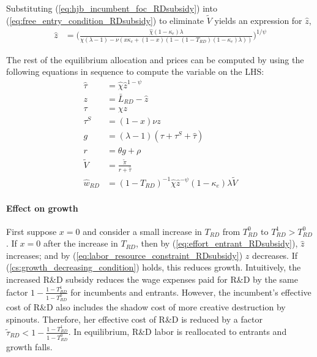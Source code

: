 \documentclass[11pt,english]{article}
\begin{document}
Substituting (\ref{eq:hjb_incumbent_foc_RDsubsidy}) into (\ref{eq:free_entry_condition_RDsubsidy}) to eliminate $\tilde{V}$ yields an expression for $\hat{z}$, 
\begin{align}
\hat{z} &= \Bigg( \frac{\hat{\chi} (1-\kappa_{e}) \lambda}{\chi(\lambda -1) - \nu (x\kappa_c + (1-x)(1 - (1-T_{RD})(1-\kappa_e)\lambda)) } \Bigg)^{1/\psi} \label{eq:effort_entrant_RDsubsidy}
\end{align}

The rest of the equilibrium allocation and prices can be computed by using the following equations in sequence to compute the variable on the LHS:
\begin{align}
\hat{\tau} &= \hat{\chi} \hat{z}^{1-\psi} \\
z &= \bar{L}_{RD} - \hat{z} \label{eq:labor_resource_constraint_RDsubsidy}\\ 
\tau &= \chi z \\
\tau^S &= (1-x) \nu z \\
g &= (\lambda - 1) (\tau + \tau^S + \hat{\tau}) \\
r &= \theta g + \rho \\
\tilde{V} &= \frac{\tilde{\pi}}{r + \hat{\tau}} \\ 
\hat{w}_{RD} &= (1-T_{RD})^{-1}\hat{\chi} \hat{z}^{-\psi} (1-\kappa_e) \lambda \tilde{V} \label{eq:wage_rd_labor_RDsubsidy}
\end{align}

\paragraph{Effect on growth}

First suppose $x = 0$ and consider a small increase in $T_{RD}$ from $T_{RD}^0$ to $T_{RD}^1 > T_{RD}^0$. If $x = 0$ after the increase in $T_{RD}$, then by (\ref{eq:effort_entrant_RDsubsidy}), $\hat{z}$ increases; and by (\ref{eq:labor_resource_constraint_RDsubsidy}) $z$ decreases. If (\ref{cs:growth_decreasing_condition}) holds, this reduces growth. Intuitively, the increased R\&D subsidy reduces the wage expenses paid for R\&D by the same factor $1-\frac{1-T_{RD}^1}{1-T_{RD}^0}$ for incumbents and entrants. However, the incumbent's effective cost of R\&D also includes the shadow cost of more creative destruction by spinouts. Therefore, her effective cost of R\&D is reduced by a factor $\tilde{\tau}_{RD} < 1-\frac{1-T_{RD}^1}{1-T_{RD}^0}$. In equilibrium, R\&D labor is reallocated to entrants and growth falls.
\end{document}
